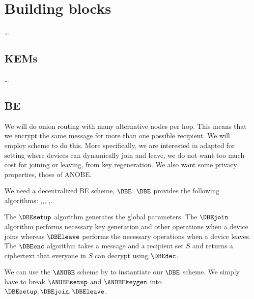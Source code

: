 \section{Building blocks}%
\label{BuildingBlocks}

\dots

\subsection{\Aclp*{KEM}}\label{KEM}

\dots

\subsection{\Acl*{BE}}\label{BE}

We will do onion routing with many alternative nodes per hop.
This means that we encrypt the same message for more than one possible 
recipient.
We will employ  scheme to do this.
More specifically, we are interested in  adapted for  setting 
where devices can dynamically join and leave, \ie we do not want too much cost 
for joining or leaving, \eg from key regeneration.
We also want some privacy properties, \ie those of \ac{ANOBE}.



We need a decentralized \ac{BE} scheme, \(\DBE\).
\(\DBE\) provides the following algorithms:
\DBEsetup,\allowbreak \DBEjoin,\allowbreak \DBEleave,\allowbreak 
\DBEenc,\allowbreak \DBEdec.

The \(\DBEsetup\) algorithm generates the global parameters.
The \(\DBEjoin\) algorithm performs necessary key generation and other 
operations when a device joins whereas \(\DBEleave\) performs the necessary 
operations when a device leaves.
The \(\DBEenc\) algorithm takes a message and a recipient set \(S\) and returns 
a ciphertext that everyone in \(S\) can decrypt using \(\DBEdec\).


We can use the \(\ANOBE\) scheme by \textcite{ANOBE} to instantiate our \(\DBE\) 
scheme.
We simply have to break \(\ANOBEsetup\) and \(\ANOBEkeygen\) into 
\(\DBEsetup,\allowbreak \DBEjoin,\allowbreak \DBEleave\).

